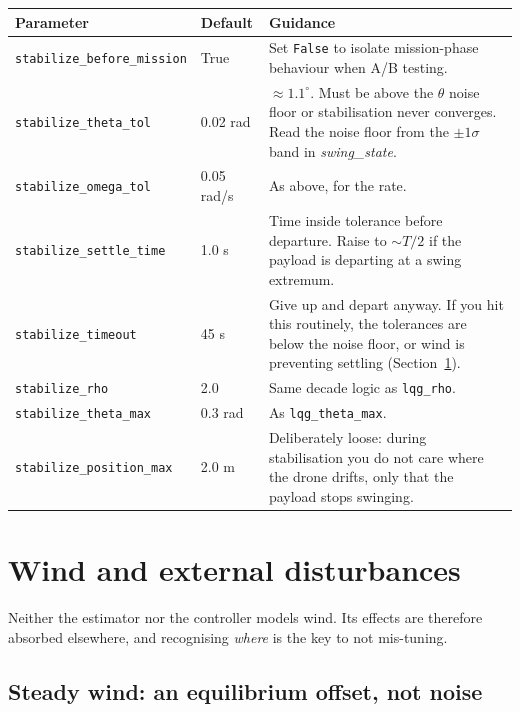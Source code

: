 \documentclass[11pt,a4paper]{article}
\newcommand{\param}[1]{\texttt{\small #1}}
\newcommand{\plot}[1]{\textit{#1}}
\begin{document}
\begin{center}
\begin{tabular}{@{}p{4.6cm}p{1.6cm}p{8.2cm}@{}}
\toprule
\textbf{Parameter} & \textbf{Default} & \textbf{Guidance} \\
\midrule
\param{stabilize\_before\_mission} & True & Set \texttt{False} to isolate
mission-phase behaviour when A/B testing. \\
\param{stabilize\_theta\_tol} & 0.02 rad &
$\approx1.1^\circ$. Must be above the $\theta$ noise floor or stabilisation
never converges. Read the noise floor from the $\pm1\sigma$ band in
\plot{swing\_state}. \\
\param{stabilize\_omega\_tol} & 0.05 rad/s & As above, for the rate. \\
\param{stabilize\_settle\_time} & 1.0 s &
Time inside tolerance before departure. Raise to $\sim T/2$ if the payload is
departing at a swing extremum. \\
\param{stabilize\_timeout} & 45 s &
Give up and depart anyway. If you hit this routinely, the tolerances are below
the noise floor, or wind is preventing settling (Section~\ref{sec:wind}). \\
\param{stabilize\_rho} & 2.0 & Same decade logic as \param{lqg\_rho}. \\
\param{stabilize\_theta\_max} & 0.3 rad & As \param{lqg\_theta\_max}. \\
\param{stabilize\_position\_max} & 2.0 m &
Deliberately loose: during stabilisation you do not care where the drone
drifts, only that the payload stops swinging. \\
\bottomrule
\end{tabular}
\end{center}

\section{Wind and external disturbances}
\label{sec:wind}

Neither the estimator nor the controller models wind. Its effects are therefore
absorbed elsewhere, and recognising \emph{where} is the key to not mis-tuning.

\subsection{Steady wind: an equilibrium offset, not noise}
\end{document}
